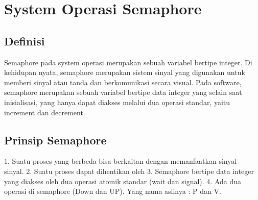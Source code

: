 \section{System Operasi Semaphore}
\subsection{Definisi}
Semaphore pada system operasi merupakan sebuah variabel bertipe integer. Di kehidupan nyata, semaphore merupakan sistem sinyal yang digunakan untuk memberi 
sinyal atau tanda dan berkomunikasi secara visual. Pada software, semaphore merupakan sebuah variabel bertipe data integer yang selain saat inisialisasi, yang 
hanya dapat diakses melalui dua operasi standar, yaitu increment dan decrement.
\subsection{Prinsip Semaphore}
1. Suatu proses yang berbeda bisa berkaitan dengan memanfaatkan sinyal - sinyal.
2. Suatu proses dapat dihentikan oleh 
3. Semaphore bertipe data integer yang diakses oleh dua operasi atomik standar (wait dan signal).
4. Ada dua operasi di semaphore (Down dan UP). Yang nama aslinya : P dan V.
